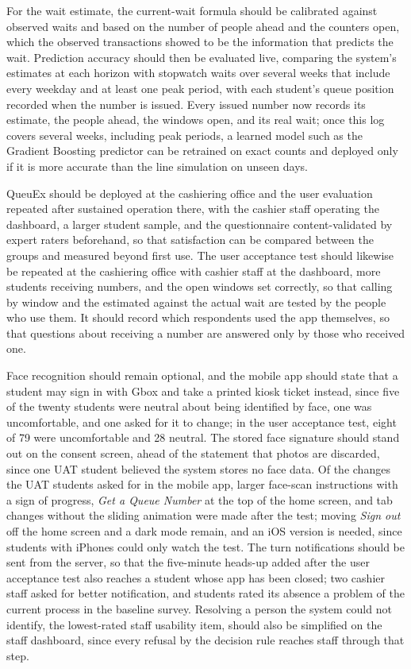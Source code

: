 \documentclass{research}
\newcommand{\sysname}{QueuEx}
\begin{document}
For the wait estimate, the current-wait formula should be calibrated
against observed waits and based on the number of people ahead and the
counters open, which the observed transactions showed to be the
information that predicts the wait. Prediction accuracy should then be
evaluated live, comparing the system's estimates at each horizon with
stopwatch waits over several weeks that include every weekday and at
least one peak period, with each student's queue position recorded when
the number is issued. Every issued number now records its estimate, the
people ahead, the windows open, and its real wait; once this log covers
several weeks, including peak periods, a learned model such as the
Gradient Boosting predictor can be retrained on exact counts and
deployed only if it is more accurate than the line simulation on unseen
days.

\sysname{} should be deployed at the cashiering office and the user
evaluation repeated after sustained operation there, with the cashier
staff operating the dashboard, a larger student sample, and the
questionnaire content-validated by expert raters beforehand, so that
satisfaction can be compared between the groups and measured beyond
first use. The user acceptance test should likewise be repeated at the
cashiering office with cashier staff at the dashboard, more students
receiving numbers, and the open windows set correctly, so that calling
by window and the estimated against the actual wait are tested by the
people who use them. It should record which respondents used the app
themselves, so that questions about receiving a number are answered only
by those who received one.

Face recognition should remain optional, and the mobile app should
state that a student may sign in with Gbox and take a printed kiosk
ticket instead, since five of the twenty students were neutral about
being identified by face, one was uncomfortable, and one asked for it to
change; in the user acceptance test, eight of 79 were uncomfortable and
28 neutral. The stored face signature should stand out on the consent
screen, ahead of the statement that photos are discarded, since one UAT
student believed the system stores no face data. Of the changes the UAT
students asked for in the mobile app, larger face-scan instructions with
a sign of progress, \emph{Get a Queue Number} at the top of the home
screen, and tab changes without the sliding animation were made after
the test; moving \emph{Sign out} off the home screen and a dark mode
remain, and an iOS version is needed, since students with iPhones could
only watch the test. The turn notifications should be sent from the
server, so that the five-minute heads-up added after the user acceptance
test also reaches a student whose app has been closed; two cashier staff
asked for better notification, and students rated its absence a problem
of the current process in the baseline survey. Resolving a person the
system could not identify, the lowest-rated staff usability item, should
also be simplified on the staff dashboard, since every refusal by the
decision rule reaches staff through that step.
\end{document}
